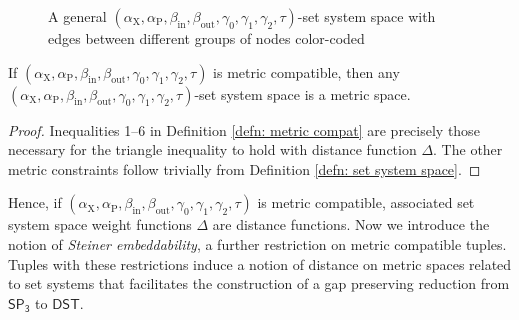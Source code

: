 \documentclass{theoretics}
\newcommand{\1}{\textbf{1}}
\newcommand{\setpT}{$\mathsf{SP_3}$\xspace}
\newcommand{\dst}{$\mathsf{DST}$\xspace}
\newcommand{\td}{\tau}
\newcommand{\srd}{\alpha_{\text{X}}}
\newcommand{\trd}{\alpha_{\text{P}}}
\begin{document}
\begin{figure}[!ht]





    \caption{A general $(\srd, \trd, \beta_{\text{in}}, \beta_{\text{out}}, \gamma_0, \gamma_1, \gamma_2, \td)$-set system space with edges between different groups of nodes color-coded}
    \label{fig: set system space}
\end{figure}


\begin{proposition}
If $(\srd, \trd, \beta_{\text{in}}, \beta_{\text{out}}, \gamma_0, \gamma_1, \gamma_2, \td)$ is metric compatible, then any \\$(\srd, \trd, \beta_{\text{in}}, \beta_{\text{out}}, \gamma_0, \gamma_1, \gamma_2, \td)$-set system space is a metric space.
\end{proposition}
\begin{proof}
Inequalities 1–6 in Definition \ref{defn: metric compat} are precisely those necessary for the triangle inequality to hold with distance function $\Delta$. The other metric constraints follow trivially from Definition \ref{defn: set system space}.
\end{proof}

Hence, if $(\srd, \trd, \beta_{\text{in}}, \beta_{\text{out}}, \gamma_0, \gamma_1, \gamma_2, \td)$ is metric compatible, associated set system space weight functions $\Delta$ are distance functions. Now we introduce the notion of \textit{Steiner embeddability}, a further restriction on metric compatible tuples. Tuples with these restrictions induce a notion of distance on metric spaces related to set systems that facilitates the construction of a gap preserving reduction from \setpT to \dst. 
\end{document}
